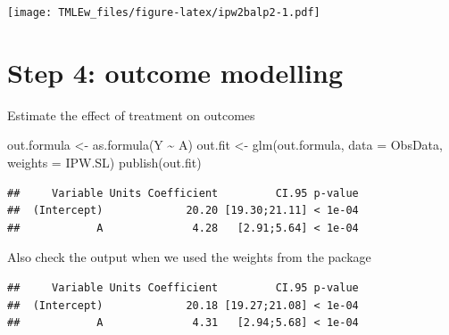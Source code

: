 \documentclass[
]{book}
\newenvironment{Shaded}{\begin{snugshade}}{\end{snugshade}}
\newcommand{\AttributeTok}[1]{\textcolor[rgb]{0.77,0.63,0.00}{#1}}
\newcommand{\FunctionTok}[1]{\textcolor[rgb]{0.00,0.00,0.00}{#1}}
\newcommand{\NormalTok}[1]{#1}
\newcommand{\OtherTok}[1]{\textcolor[rgb]{0.56,0.35,0.01}{#1}}
\newcommand{\SpecialCharTok}[1]{\textcolor[rgb]{0.00,0.00,0.00}{#1}}
\begin{document}
\texttt{[image: TMLEw\_files/figure-latex/ipw2balp2-1.pdf]}

\hypertarget{step-4-outcome-modelling-1}{%
\section{Step 4: outcome modelling}\label{step-4-outcome-modelling-1}}

Estimate the effect of treatment on outcomes

\begin{Shaded}
\begin{Highlighting}[]
\NormalTok{out.formula }\OtherTok{\textless{}{-}} \FunctionTok{as.formula}\NormalTok{(Y }\SpecialCharTok{\textasciitilde{}}\NormalTok{ A)}
\NormalTok{out.fit }\OtherTok{\textless{}{-}} \FunctionTok{glm}\NormalTok{(out.formula,}
               \AttributeTok{data =}\NormalTok{ ObsData,}
               \AttributeTok{weights =}\NormalTok{ IPW.SL)}
\FunctionTok{publish}\NormalTok{(out.fit)}
\end{Highlighting}
\end{Shaded}

\begin{verbatim}
##     Variable Units Coefficient         CI.95 p-value 
##  (Intercept)             20.20 [19.30;21.11] < 1e-04 
##            A              4.28   [2.91;5.64] < 1e-04
\end{verbatim}

Also check the output when we used the weights from the package

\begin{Shaded}
\end{Shaded}

\begin{verbatim}
##     Variable Units Coefficient         CI.95 p-value 
##  (Intercept)             20.18 [19.27;21.08] < 1e-04 
##            A              4.31   [2.94;5.68] < 1e-04
\end{verbatim}
\end{document}
